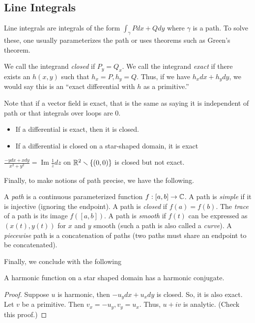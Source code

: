 \documentclass[11pt,leqno,oneside]{amsart}
\numberwithin{thm}{section}
\renewcommand{\Im}{\operatorname{Im}}
\begin{document}
  \subsection{Line Integrals}
  Line integrals are integrals of the form $\int_\gamma Pdx + Qdy$ where
  $\gamma$ is a path. To solve these, one usually parameterizes the path or uses
  theorems such as Green's theorem.
  \begin{defn}
    We call the integrand \emph{closed} if $P_y = Q_x$. We call the integrand
    \emph{exact} if there exists an $h(x,y)$ such that $h_x = P, h_y = Q$. Thus,
    if we have $h_xdx+h_ydy$, we would say this is an ``exact differential with
    $h$ as a primitive.''
  \end{defn}
  Note that if a vector field is exact, that is the same as saying it is
  independent of path or that integrals over loops are 0.
  \begin{rmk}
    \begin{itemize}
    \item If a differential is exact, then it is closed.
    \item If a differential is closed on a star-shaped domain, it is exact
    \end{itemize}
  \end{rmk}
  \begin{example}
    $\frac{-ydx+xdy}{x^2+y^2} = \Im \frac{1}{z}dz$ on ${\mathbb R}^2 \smallsetminus
    \{(0,0)\}$ is closed but not exact.
  \end{example}
  Finally, to make notions of path precise, we have the following.
\begin{defn}
    A \emph{path} is a continuous parameterized function $f:[a,b] \to {\mathbb C}$.  A
    path is \emph{simple} if it is injective (ignoring the endpoint).  A path is
    \emph{closed} if $f(a) = f(b)$.  The \emph{trace} of a path is its image
    $f([a,b])$.  A path is \emph{smooth} if $f(t)$ can be expressed as $(x(t),
    y(t))$ for $x$ and $y$ smooth (such a path is also called a \emph{curve}).
    A \emph{piecewise} path is a concatenation of paths (two paths must share an
    endpoint to be concatenated).
  \end{defn}

  Finally, we conclude with the following
  \begin{thm}
    A harmonic function on a star shaped domain has a harmonic conjugate.
  \end{thm}
  \begin{proof}
    Suppose $u$ is harmonic, then $-u_ydx+u_xdy$ is closed. So, it is also
    exact. Let $v$ be a primitive. Then $v_x = -u_y, v_y=u_x$. Thus, $u+iv$ is
    analytic. (Check this proof.)
  \end{proof}
\end{document}

